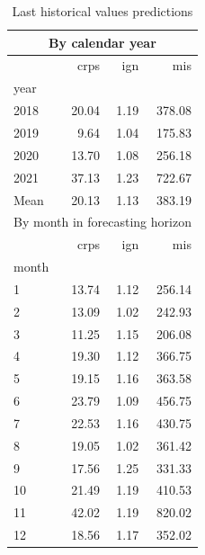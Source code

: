 \documentclass[runningheads]{llncs}
\begin{document}
    \begin{table}[ht]
        \centering
        \begin{subtable}[t]{.45\textwidth}
            \centering

            \begin{tabular}{l@{\hskip 0.5cm}r@{\hskip 0.5cm}r@{\hskip 0.5cm}r}
                \toprule
                \multicolumn{4}{c}{By calendar year} \\
                \midrule
                & crps  & ign  & mis    \\
                year  &       &      &        \\
                \midrule
                2018  & 20.04 & 1.19 & 378.08 \\
                2019  & 9.64  & 1.04 & 175.83 \\
                2020  & 13.70 & 1.08 & 256.18 \\
                2021  & 37.13 & 1.23 & 722.67 \\
                Mean  & 20.13 & 1.13 & 383.19 \\
                \midrule
                \multicolumn{4}{c}{By month in forecasting horizon} \\
                \midrule
                & crps  & ign  & mis    \\
                month &       &      &        \\
                \midrule
                1     & 13.74 & 1.12 & 256.14 \\
                2     & 13.09 & 1.02 & 242.93 \\
                3     & 11.25 & 1.15 & 206.08 \\
                4     & 19.30 & 1.12 & 366.75 \\
                5     & 19.15 & 1.16 & 363.58 \\
                6     & 23.79 & 1.09 & 456.75 \\
                7     & 22.53 & 1.16 & 430.75 \\
                8     & 19.05 & 1.02 & 361.42 \\
                9     & 17.56 & 1.25 & 331.33 \\
                10    & 21.49 & 1.19 & 410.53 \\
                11    & 42.02 & 1.19 & 820.02 \\
                12    & 18.56 & 1.17 & 352.02 \\
                \bottomrule
            \end{tabular}
            \caption{Last historical values predictions}
            \label{tab:perf_boostrap_benchmark}
        \end{subtable}%
        \hspace{0.05\textwidth}%
        \begin{subtable}[t]{.45\textwidth}
            \centering


\end{subtable}
\end{table}
\end{document}
